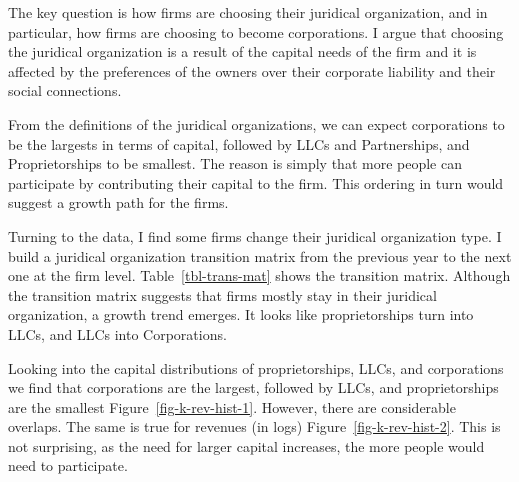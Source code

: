 \documentclass[
  12pt]{article}
\theoremstyle{definition}
\theoremstyle{remark}
\begin{document}
The key question is how firms are choosing their juridical organization,
and in particular, how firms are choosing to become corporations. I
argue that choosing the juridical organization is a result of the
capital needs of the firm and it is affected by the preferences of the
owners over their corporate liability and their social connections.

From the definitions of the juridical organizations, we can expect
corporations to be the largests in terms of capital, followed by LLCs
and Partnerships, and Proprietorships to be smallest. The reason is
simply that more people can participate by contributing their capital to
the firm. This ordering in turn would suggest a growth path for the
firms.

Turning to the data, I find some firms change their juridical
organization type. I build a juridical organization transition matrix
from the previous year to the next one at the firm level.
Table~\ref{tbl-trans-mat} shows the transition matrix. Although the
transition matrix suggests that firms mostly stay in their juridical
organization, a growth trend emerges. It looks like proprietorships turn
into LLCs, and LLCs into Corporations.

\begin{table}

\caption{\label{tbl-trans-mat}Transition Matrix}


\end{table}%

Looking into the capital distributions of proprietorships, LLCs, and
corporations we find that corporations are the largest, followed by
LLCs, and proprietorships are the smallest
Figure~\ref{fig-k-rev-hist-1}. However, there are considerable overlaps.
The same is true for revenues (in logs) Figure~\ref{fig-k-rev-hist-2}.
This is not surprising, as the need for larger capital increases, the
more people would need to participate.
\end{document}
